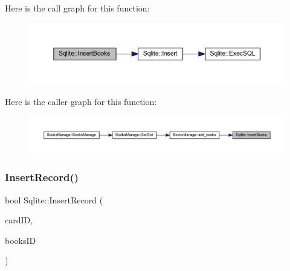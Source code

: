 Here is the call graph for this function\+:
\nopagebreak
\begin{figure}[H]
\begin{center}
\leavevmode
\includegraphics[width=350pt]{class_sqlite_a246c39ac5e6db51d8bf2fa60e2740d37_cgraph}
\end{center}
\end{figure}
Here is the caller graph for this function\+:
\nopagebreak
\begin{figure}[H]
\begin{center}
\leavevmode
\includegraphics[width=350pt]{class_sqlite_a246c39ac5e6db51d8bf2fa60e2740d37_icgraph}
\end{center}
\end{figure}
\mbox{\label{class_sqlite_a278f03d5b8e7f6dba8e97d3d5310c4b5}} 
\subsubsection{\texorpdfstring{InsertRecord()}{InsertRecord()}}
{\footnotesize\ttfamily bool Sqlite\+::\+Insert\+Record (\begin{DoxyParamCaption}\item[{Q\+String}]{card\+ID,  }\item[{Q\+String}]{books\+ID }\end{DoxyParamCaption})}

